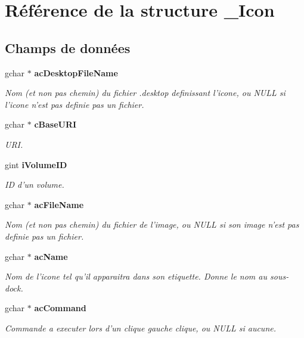 \section{Référence de la structure \_\-Icon}
\label{struct__Icon}
\subsection*{Champs de données}
\begin{CompactItemize}
\item 
gchar $\ast$ {\bf acDesktopFileName}
\begin{CompactList}\small\item\em Nom (et non pas chemin) du fichier .desktop definissant l'icone, ou NULL si l'icone n'est pas definie pas un fichier. \item\end{CompactList}\item 
gchar $\ast$ {\bf cBaseURI}
\begin{CompactList}\small\item\em URI. \item\end{CompactList}\item 
gint {\bf iVolumeID}
\begin{CompactList}\small\item\em ID d'un volume. \item\end{CompactList}\item 
gchar $\ast$ {\bf acFileName}
\begin{CompactList}\small\item\em Nom (et non pas chemin) du fichier de l'image, ou NULL si son image n'est pas definie pas un fichier. \item\end{CompactList}\item 
gchar $\ast$ {\bf acName}
\begin{CompactList}\small\item\em Nom de l'icone tel qu'il apparaitra dans son etiquette. Donne le nom au sous-dock. \item\end{CompactList}\item 
gchar $\ast$ {\bf acCommand}
\begin{CompactList}\small\item\em Commande a executer lors d'un clique gauche clique, ou NULL si aucune. \item\end{CompactList}\item 

\end{CompactItemize}
